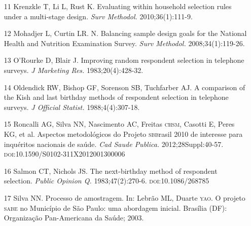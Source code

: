 \documentclass{article}
\begin{document}
\begin{itemize}
\item[11] Krenzkle T, Li L, Rust K. Evaluating within household selection rules
under a multi-stage design. \textit{Surv Methodol.}
2010;36(1):111-9.

\item[12] Mohadjer L, Curtin LR. N. Balancing sample design goals for the
National Health and Nutrition Examination Survey. \textit{Surv Methodol. }
2008;34(1):119-26.

\item[13] O’Rourke D, Blair J. Improving random respondent selection in
telephone surveys. \textit{J Marketing Res.}
1983;20(4):428-32.

\item[14] Oldendick RW, Bishop GF, Sorenson SB, Tuchfarber AJ. A comparison of
the Kish and last birthday methods of respondent selection in telephone surveys.
\textit{J Official Statist.}
1988;4(4):307-18.

\item[15] Roncalli AG, Silva NN, Nascimento AC, Freitas \textsc{chsm}, Casotti E, Peres
KG, et al. Aspectos metodológicos do Projeto \textsc{sbb}rasil 2010 de interesse para
inquéritos nacionais de saúde. \textit{Cad Saude Publica.}
2012;28Suppl:40-57. \textsc{doi}:10.1590/S0102-311X2012001300006

\item[16] Salmon CT, Nichols JS. The next-birthday method of respondent
selection. \textit{Public Opinion Q.}
1983;47(2):270-6. \textsc{doi}:10.1086/268785

\item[17] Silva NN. Processo de amostragem. In: Lebrão ML, Duarte \textsc{yao}. O projeto
\textsc{sabe} no Município de São Paulo: uma abordagem inicial. Brasília (DF):
Organização Pan-Americana da Saúde; 2003.

\end{itemize}
\end{document}
